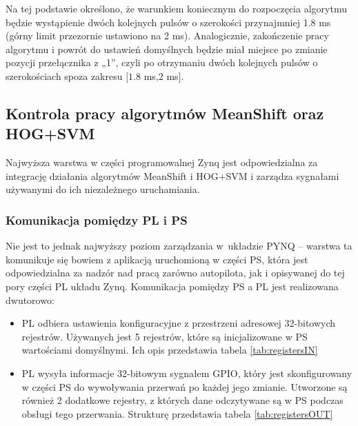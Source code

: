 Na tej podstawie określono, że warunkiem koniecznym do rozpoczęcia algorytmu będzie wystąpienie dwóch kolejnych pulsów o szerokości przynajmniej 1.8 ms (górny limit przezornie ustawiono na 2 ms). 
Analogicznie, zakończenie pracy algorytmu i powrót do ustawień domyślnych będzie miał miejsce po zmianie pozycji przełącznika z „1”, czyli po otrzymaniu dwóch kolejnych pulsów o szerokościach spoza zakresu $[1.8$ ms,$2$ ms$]$.


\subsection{Kontrola pracy algorytmów MeanShift oraz HOG+SVM}

Najwyższa warstwa w części programowalnej Zynq jest odpowiedzialna za integrację działania algorytmów MeanShift i HOG+SVM i zarządza sygnałami używanymi do ich niezależnego uruchamiania. 

\subsubsection{Komunikacja pomiędzy PL i PS}

Nie jest to jednak najwyższy poziom zarządzania w~układzie PYNQ -- warstwa ta komunikuje się bowiem z aplikacją uruchomioną w części PS, która jest odpowiedzialna za nadzór nad pracą zarówno autopilota, jak i opisywanej do tej pory części PL układu Zynq.
Komunikacja pomiędzy PS a PL jest realizowana dwutorowo:
\begin{itemize}
	\item PL odbiera ustawienia konfiguracyjne z przestrzeni adresowej 32-bitowych rejestrów. Używanych jest 5 rejestrów, które są inicjalizowane w PS wartościami domyślnymi. Ich opis przedstawia tabela \ref{tab:registersIN}	
	\item PL wysyła informacje 32-bitowym sygnałem GPIO, który jest skonfigurowany w części PS do wywoływania przerwań po każdej jego zmianie. Utworzone są również 2 dodatkowe rejestry, z których dane odczytywane są w PS podczas obsługi tego przerwania. Strukturę przedstawia tabela \ref {tab:registersOUT}
\end{itemize} 

